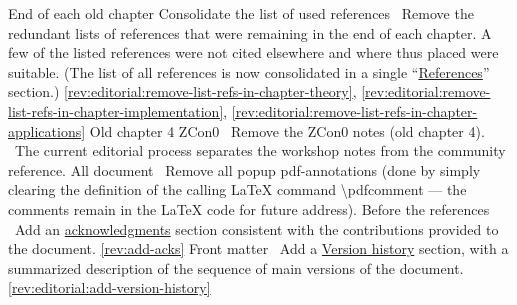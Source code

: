 End of each old chapter
\newcol Consolidate the list of used references
\newcol 
\newcol \Chan\ Remove the redundant lists of references that were remaining in the end of each chapter.
				A few of the listed references were not cited elsewhere and where thus placed were suitable.
				(The list of all references is now consolidated in a single ``\hyperref[references]{References}'' section.)
\newcol \ref{rev:editorial:remove-list-refs-in-chapter-theory}, \ref{rev:editorial:remove-list-refs-in-chapter-implementation}, \ref{rev:editorial:remove-list-refs-in-chapter-applications}
\rowendL
Old chapter 4 ZCon0
\newcol 
\newcol {}
\newcol \Chan\ Remove the ZCon0 notes (old chapter 4). \Note\ The current editorial process separates the workshop notes from the community reference.
\newcol 
\rowendL
All document
\newcol 
\newcol {}
\newcol \Chan\ Remove all popup pdf-annotations (done by simply clearing the definition 
				of the calling LaTeX command \textbackslash{}pdfcomment --- the comments remain 
				in the LaTeX code for future address).
\newcol 
\rowendL
Before the references
\newcol 
\newcol {}
\newcol \Chan\ Add an \hyperref[app:acknowledgments]{acknowledgments} section consistent with the contributions provided to the document.
\newcol \ref{rev:add-acks}
\rowendL
Front matter
\newcol 
\newcol {}
\newcol \Chan\ Add a \hyperref[app:version-history]{Version history} section, with a summarized description of the sequence of main versions of the document.
\newcol \ref{rev:editorial:add-version-history}
\rowendL
\myendIssue
